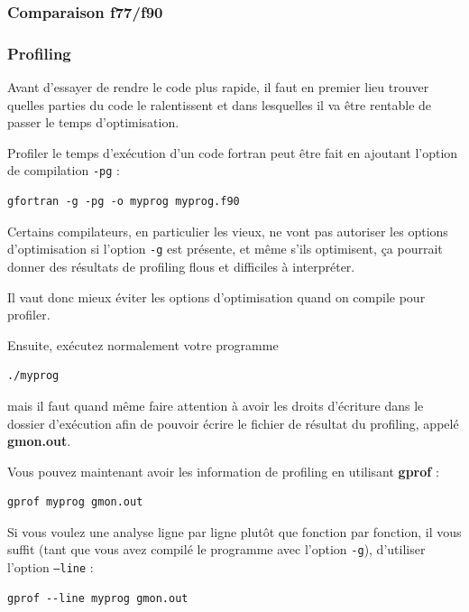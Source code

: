 \documentclass[a4paper,twoside]{article}
\begin{document}
\subsubsection{Comparaison f77/f90}
\subsubsection{Profiling}
Avant d'essayer de rendre le code plus rapide, il faut en premier lieu trouver quelles parties du code le ralentissent et dans lesquelles il va être rentable de passer le temps d'optimisation.

Profiler le temps d'exécution d'un code fortran peut être fait en ajoutant l'option de compilation \texttt{-pg} : 
\begin{verbatim}
gfortran -g -pg -o myprog myprog.f90
\end{verbatim}

\begin{remarque}
Certains compilateurs, en particulier les vieux, ne vont pas autoriser les options d'optimisation si l'option \texttt{-g} est présente, et même s'ils optimisent, ça pourrait donner des résultats de profiling flous et difficiles à interpréter. 

Il vaut donc mieux éviter les options d'optimisation quand on compile pour profiler. 
\end{remarque}

Ensuite, exécutez normalement votre programme
\begin{verbatim}
./myprog
\end{verbatim}
mais il faut quand même faire attention à avoir les droits d'écriture dans le dossier d'exécution afin de pouvoir écrire le fichier de résultat du profiling, appelé \textbf{gmon.out}. 

\bigskip

Vous pouvez maintenant avoir les information de profiling en utilisant \textbf{gprof} :
\begin{verbatim}
gprof myprog gmon.out
\end{verbatim}

\begin{remarque}
Si vous voulez une analyse ligne par ligne plutôt que fonction par fonction, il vous suffit (tant que vous avez compilé le programme avec l'option \texttt{-g}), d'utiliser l'option \texttt{--line} :
\begin{verbatim}
gprof --line myprog gmon.out
\end{verbatim}
\end{remarque}
\end{document}
